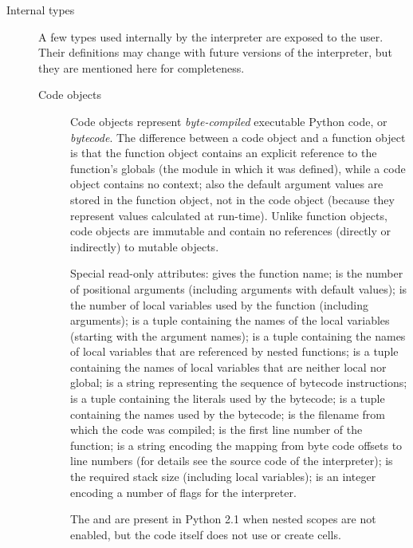 \begin{description}
\item[Internal types]
A few types used internally by the interpreter are exposed to the user.
Their definitions may change with future versions of the interpreter,
but they are mentioned here for completeness.

\begin{description}

\item[Code objects]
Code objects represent \emph{byte-compiled} executable Python code, or 
\emph{bytecode}.
The difference between a code
object and a function object is that the function object contains an
explicit reference to the function's globals (the module in which it
was defined), while a code object contains no context; 
also the default argument values are stored in the function object,
not in the code object (because they represent values calculated at
run-time).  Unlike function objects, code objects are immutable and
contain no references (directly or indirectly) to mutable objects.

Special read-only attributes:  gives the function
name;  is the number of positional arguments
(including arguments with default values);  is the
number of local variables used by the function (including arguments);
 is a tuple containing the names of the local
variables (starting with the argument names);  is
a tuple containing the names of local variables that are referenced by
nested functions;  is a tuple containing the names
of local variables that are neither local nor global; 
is a string representing the sequence of bytecode instructions;
 is a tuple containing the literals used by the
bytecode;  is a tuple containing the names used by
the bytecode;  is the filename from which the code
was compiled;  is the first line number of the
function;  is a string encoding the mapping from
byte code offsets to line numbers (for details see the source code of
the interpreter);  is the required stack size
(including local variables);  is an integer encoding
a number of flags for the interpreter.

The  and  are present in
Python 2.1 when nested scopes are not enabled, but the code itself
does not use or create cells.


\end{description}
\end{description}
